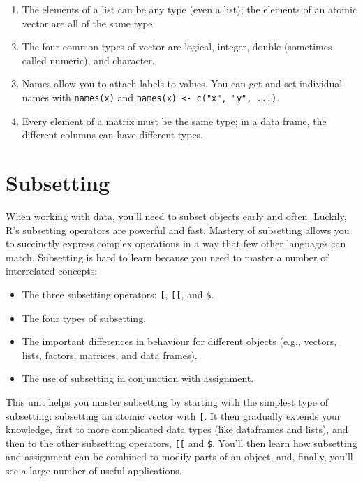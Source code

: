 \documentclass[]{book}
\begin{document}
\begin{enumerate}
\def\labelenumi{\arabic{enumi}.}
\item
  The elements of a list can be any type (even a list); the elements of
  an atomic vector are all of the same type.
\item
  The four common types of vector are logical, integer, double
  (sometimes called numeric), and character.
\item
  Names allow you to attach labels to values. You can get and set
  individual names with \texttt{names(x)} and
  \texttt{names(x)\ \textless{}-\ c("x",\ "y",\ ...)}.
\item
  Every element of a matrix must be the same type; in a data frame, the
  different columns can have different types.
\end{enumerate}

\chapter{Subsetting}\label{subsetting}

When working with data, you'll need to subset objects early and often.
Luckily, R's subsetting operators are powerful and fast. Mastery of
subsetting allows you to succinctly express complex operations in a way
that few other languages can match. Subsetting is hard to learn because
you need to master a number of interrelated concepts:

\begin{itemize}
\item
  The three subsetting operators: \texttt{{[}}, \texttt{{[}{[}}, and
  \texttt{\$}.
\item
  The four types of subsetting.
\item
  The important differences in behaviour for different objects (e.g.,
  vectors, lists, factors, matrices, and data frames).
\item
  The use of subsetting in conjunction with assignment.
\end{itemize}

This unit helps you master subsetting by starting with the simplest type
of subsetting: subsetting an atomic vector with \texttt{{[}}. It then
gradually extends your knowledge, first to more complicated data types
(like dataframes and lists), and then to the other subsetting operators,
\texttt{{[}{[}} and \texttt{\$}. You'll then learn how subsetting and
assignment can be combined to modify parts of an object, and, finally,
you'll see a large number of useful applications.
\end{document}
